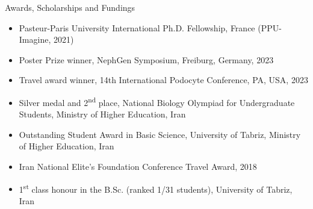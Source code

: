 \documentclass[
	11pt, %
]{resume} %
\begin{document}

\begin{rSection}{Awards, Scholarships and Fundings}

\begin{itemize}
  \item Pasteur-Paris University International Ph.D. Fellowship, France (PPU-Imagine, 2021)
  \item Poster Prize winner, NephGen Symposium, Freiburg, Germany, 2023
  \item Travel award winner, 14th International Podocyte Conference, PA, USA, 2023
  \item Silver medal and 2\textsuperscript{nd} place, National Biology Olympiad for Undergraduate Students, 
        Ministry of Higher Education, Iran
  \item Outstanding Student Award in Basic Science, University of Tabriz, Ministry of Higher Education, Iran
  \item Iran National Elite’s Foundation Conference Travel Award, 2018
  \item 1\textsuperscript{st} class honour in the B.Sc. (ranked 1/31 students), University of Tabriz, Iran
\end{itemize}

\end{rSection}

\end{document}
